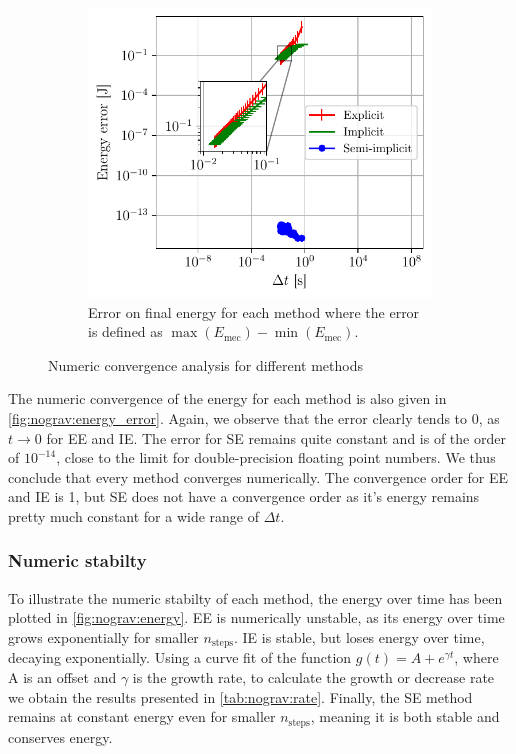 \begin{figure}[h]
\begin{subfigure}{0.45\linewidth}
        \includegraphics[width=\linewidth]{figures/nograv_energy_error_all.pdf}
        \caption{Error on final energy for each method where the error is defined as $\max(E_\textrm{mec}) - \min(E_\textrm{mec}).$}
        \label{fig:nograv:energy_error}
    \end{subfigure}
    \caption{Numeric convergence analysis for different methods}
\end{figure}

The numeric convergence of the energy for each method is also given in \autoref{fig:nograv:energy_error}. Again, we observe that the error clearly tends to 0, as $t \rightarrow 0$ for EE and IE. The error for SE remains quite constant and is of the order of $10^{-14}$, close to the limit for double-precision floating point numbers. We thus conclude that every method converges numerically. The convergence order for EE and IE is 1, but SE does not have a convergence order as it's energy remains pretty much constant for a wide range of $\Delta t$.

\subsubsection{Numeric stabilty}

To illustrate the numeric stabilty of each method, the energy over time has been plotted in \autoref{fig:nograv:energy}. EE is numerically unstable, as its energy over time grows exponentially for smaller $n_\textrm{steps}$. IE is stable, but loses energy over time, decaying exponentially. Using a curve fit of the function $g(t) = A + e^{\gamma t}$, where A is an offset and $\gamma$ is the growth rate, to calculate the growth or decrease rate we obtain the results presented in \autoref{tab:nograv:rate}. Finally, the SE method remains at constant energy even for smaller $n_\textrm{steps}$, meaning it is both stable and conserves energy.

